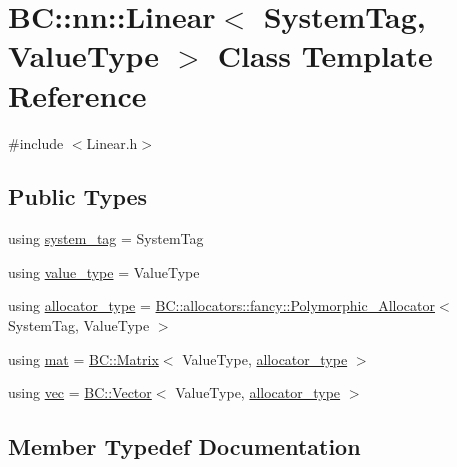 \hypertarget{classBC_1_1nn_1_1Linear}{}\section{BC\+:\+:nn\+:\+:Linear$<$ System\+Tag, Value\+Type $>$ Class Template Reference}
\label{classBC_1_1nn_1_1Linear}


{\ttfamily \#include $<$Linear.\+h$>$}

\subsection*{Public Types}
\begin{DoxyCompactItemize}
\item 
using \hyperlink{classBC_1_1nn_1_1Linear_ad5d1417607b13e05aa6ac48f196b2f4f}{system\+\_\+tag} = System\+Tag
\item 
using \hyperlink{classBC_1_1nn_1_1Linear_ae8c65a46a545fe1e5efe9db19dbc3ae2}{value\+\_\+type} = Value\+Type
\item 
using \hyperlink{classBC_1_1nn_1_1Linear_aec884ef89e09cbcbc77cfaf8acfdc7ae}{allocator\+\_\+type} = \hyperlink{structBC_1_1allocators_1_1fancy_1_1Polymorphic__Allocator}{B\+C\+::allocators\+::fancy\+::\+Polymorphic\+\_\+\+Allocator}$<$ System\+Tag, Value\+Type $>$
\item 
using \hyperlink{classBC_1_1nn_1_1Linear_a33a0fc0ae9bad4f6af4414fd9a27f473}{mat} = \hyperlink{namespaceBC_1_1tensors_1_1common__using_a6fc3153d379a42b1a97df46ed5b71a29}{B\+C\+::\+Matrix}$<$ Value\+Type, \hyperlink{classBC_1_1nn_1_1Linear_aec884ef89e09cbcbc77cfaf8acfdc7ae}{allocator\+\_\+type} $>$
\item 
using \hyperlink{classBC_1_1nn_1_1Linear_aa38b4edd892ccfb0ecfde08f5a5dfdb3}{vec} = \hyperlink{namespaceBC_1_1tensors_1_1common__using_ab2d6784064c0dda8aef3c2a9177ffa77}{B\+C\+::\+Vector}$<$ Value\+Type, \hyperlink{classBC_1_1nn_1_1Linear_aec884ef89e09cbcbc77cfaf8acfdc7ae}{allocator\+\_\+type} $>$
\end{DoxyCompactItemize}


\subsection{Member Typedef Documentation}
